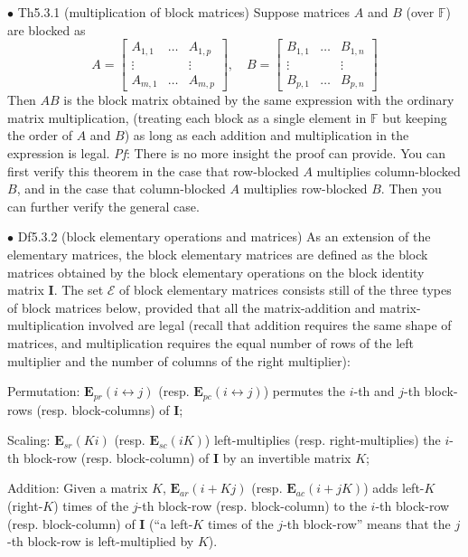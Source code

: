 \documentclass{article}
\begin{document}
\begin{Th}{$\bullet$ Th5.3.1 (multiplication of block matrices)}
    Suppose matrices $A$ and $B$ (over $\mathbb{F}$) are blocked as 
    $$
    A = \begin{bmatrix}
        A_{1,1} & \dots & A_{1,p}\\
        \vdots  &       &\vdots\\
        A_{m,1} & \dots & A_{m,p}
    \end{bmatrix}, \quad
    B = \begin{bmatrix}
        B_{1,1} & \dots & B_{1,n}\\
        \vdots  &       &\vdots\\
        B_{p,1} & \dots & B_{p,n}
    \end{bmatrix}
    $$
    Then $AB$ is the block matrix obtained by the same expression with the ordinary matrix multiplication, (treating each block as a single element in $\mathbb{F}$ but keeping the order of $A$ and $B$) as long as each addition and multiplication in the expression is legal.
    \tcblower
    \textit{Pf}: There is no more insight the proof can provide. You can first verify this theorem in the case that row-blocked $A$ multiplies column-blocked $B$, and in the case that column-blocked $A$ multiplies row-blocked $B$. Then you can further verify the general case. 
\end{Th}

\begin{Df}{$\bullet$ Df5.3.2 (block elementary operations and matrices)}
    As an extension of the elementary matrices, the block elementary matrices are defined as the block matrices obtained by the block elementary operations on the block identity matrix $\pmb{I}$. The set $\pmb{\mathcal{E}}$ of block elementary matrices consists still of the three types of block matrices below, provided that all the matrix-addition and matrix-multiplication involved are legal (recall that addition requires the same shape of matrices, and multiplication requires the equal number of rows of the left multiplier and the number of columns of the right multiplier):
    \begin{compactenum}
        \item Permutation: $\pmb{E}_{pr}(i\leftrightarrow j)$ (resp. $\pmb{E}_{pc}(i\leftrightarrow j)$) permutes the $i$-th and $j$-th block-rows (resp. block-columns) of $\pmb{I}$;
        \item Scaling: $\pmb{E}_{sr}(Ki)$ (resp. $\pmb{E}_{sc}(iK)$) left-multiplies (resp. right-multiplies) the $i$-th block-row (resp. block-column) of $\pmb{I}$ by an invertible matrix $K$;
        \item Addition: Given a matrix $K$, $\pmb{E}_{ar}(i+Kj)$ (resp. $\pmb{E}_{ac}(i+jK)$) adds left-$K$ (right-$K$) times of the $j$-th block-row (resp. block-column) to the $i$-th block-row (resp. block-column) of $\pmb{I}$ (``a left-$K$ times of the $j$-th block-row'' means that the $j$-th block-row is left-multiplied by $K$). 
    \end{compactenum}
\end{Df}
\end{document}

